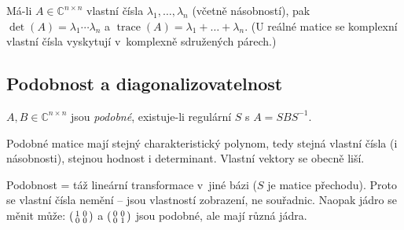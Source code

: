 \documentclass[11pt,a4paper]{article}
\newcommand{\tr}{\operatorname{trace}}
\begin{document}

\begin{veta}
Má-li $A\in\mathbb{C}^{n\times n}$ vlastní čísla $\lambda_1,\dots,\lambda_n$ (včetně násobností), pak $\det(A)=\lambda_1\cdots\lambda_n$ a $\tr(A)=\lambda_1+\dots+\lambda_n$. (U reálné matice se komplexní vlastní čísla vyskytují v~komplexně sdružených párech.)
\end{veta}


\subsection{Podobnost a diagonalizovatelnost}

\begin{definice}[Podobnost]
$A,B\in\mathbb{C}^{n\times n}$ jsou \emph{podobné}, existuje-li regulární $S$ s $A=SBS^{-1}$.
\end{definice}

\begin{veta}
Podobné matice mají stejný charakteristický polynom, tedy stejná vlastní čísla (i násobnosti), stejnou hodnost i determinant. Vlastní vektory se obecně liší.
\end{veta}

\begin{intuice}
Podobnost = táž lineární transformace v~jiné bázi ($S$ je matice přechodu). Proto se vlastní čísla nemění -- jsou vlastností zobrazení, ne souřadnic. Naopak jádro se měnit může: $\begin{psmallmatrix}1&0\\0&0\end{psmallmatrix}$ a $\begin{psmallmatrix}0&0\\0&1\end{psmallmatrix}$ jsou podobné, ale mají různá jádra.
\end{intuice}

\end{document}
